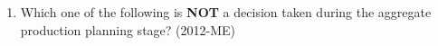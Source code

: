 \documentclass[journal,12pt,twocolumn]{IEEEtran}
\theoremstyle{remark}
\begin{document}
\begin{enumerate}
\item Which one of the following is \textbf{NOT} a decision taken during the aggregate production planning stage? \hfill{(2012-ME)} 
                 \begin{enumerate}   
                         \end{enumerate}








\end{enumerate}
\end{document}
